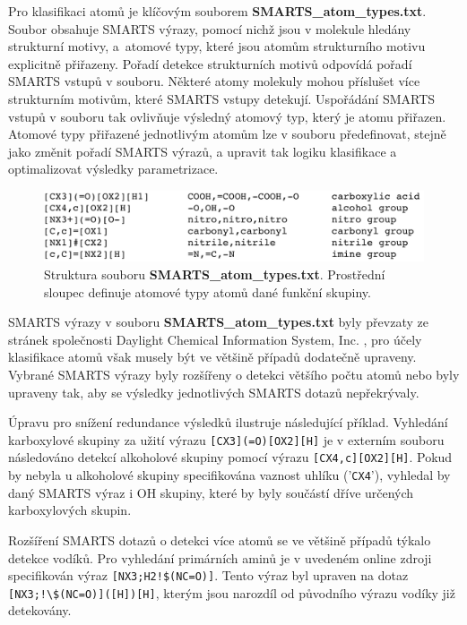 \bigskip
Pro klasifikaci atomů je klíčovým souborem \textbf{SMARTS\_atom\_types.txt}. Soubor obsahuje SMARTS výrazy, pomocí nichž jsou v molekule hledány strukturní motivy, a~atomové typy, které jsou atomům strukturního motivu explicitně přiřazeny.
Pořadí detekce strukturních motivů odpovídá pořadí SMARTS vstupů v souboru. Některé atomy molekuly mohou příslušet více strukturním motivům, které SMARTS vstupy detekují. Uspořádání SMARTS vstupů v souboru tak ovlivňuje výsledný atomový typ, který je atomu přiřazen. Atomové typy přiřazené jednotlivým atomům lze v souboru předefinovat, stejně jako změnit pořadí SMARTS výrazů, a upravit tak logiku klasifikace a optimalizovat výsledky parametrizace.
\begin{figure}[h]
    \centering
    \includegraphics[width=14cm]{pictures/SMARTS_legend_2.png}
    \caption{Struktura souboru \textbf{SMARTS\_atom\_types.txt}. Prostřední sloupec definuje atomové typy atomů dané funkční skupiny.}
    \label{SMARTS_file}
\end{figure}

SMARTS výrazy v souboru \textbf{SMARTS\_atom\_types.txt} byly převzaty ze stránek společnosti Daylight Chemical Information System, Inc. \cite{SMARTS_exm}, pro účely klasifikace atomů však musely být ve většině případů dodatečně upraveny. Vybrané SMARTS výrazy byly rozšířeny o detekci většího počtu atomů nebo byly upraveny tak, aby %
se výsledky jednotlivých SMARTS dotazů nepřekrývaly. 

Úpravu pro snížení redundance výsledků ilustruje následující příklad. Vyhledání karboxylové skupiny za užití výrazu \verb|[CX3](=O)[OX2][H]| je v externím souboru následováno detekcí alkoholové skupiny pomocí výrazu \verb|[CX4,c][OX2][H]|. Pokud by nebyla u alkoholové skupiny specifikována vaznost uhlíku ('\verb|CX4|'), vyhledal by daný SMARTS výraz i OH skupiny, které by byly součástí dříve určených karboxylových skupin. 

Rozšíření SMARTS dotazů o detekci více atomů se ve většině případů týkalo detekce vodíků. Pro vyhledání primárních aminů je v uvedeném online zdroji specifikován výraz \verb|[NX3;H2!$(NC=O)]|. Tento výraz byl upraven
na dotaz \verb|[NX3;!\$(NC=O)]([H])[H]|, kterým jsou narozdíl od původního výrazu vodíky již detekovány.
 
